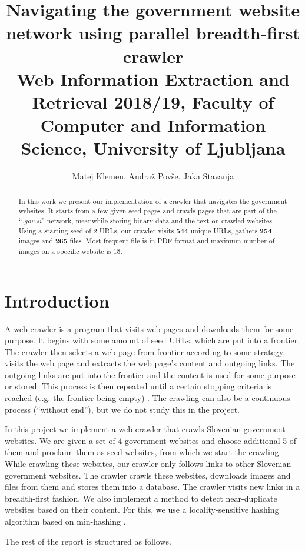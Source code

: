 \documentclass[9pt]{IEEEtran}
\title{\vspace{0ex} %
Navigating the government website network using parallel breadth-first crawler
\\ \normalsize{Web Information Extraction and Retrieval 2018/19, Faculty of Computer and Information Science, University of Ljubljana}}
\author{ %
Matej Klemen, Andraž Povše, Jaka Stavanja
\vspace{-4.0ex}
}
\begin{document}
\maketitle

\begin{abstract}
In this work we present our implementation of a crawler that navigates the government websites.
It starts from a few given seed pages and crawls pages that are part of the ``\textit{.gov.si}'' network, meanwhile storing binary data and the text on crawled websites.
Using a starting seed of 2 URLs, our crawler visits \textbf{544} unique URLs, gathers \textbf{254} images and \textbf{265} files. Most frequent file is in PDF format and maximum number of images on a specific website is 15.
\end{abstract}

\section{Introduction}

A web crawler is a program that visits web pages and downloads them for some purpose.
It begins with some amount of seed URLs, which are put into a frontier.
The crawler then selects a web page from frontier according to some strategy, visits the web page and extracts the web page's content and outgoing links.
The outgoing links are put into the frontier and the content is used for some purpose or stored.
This process is then repeated until a certain stopping criteria is reached (e.g. the frontier being empty) \cite{Manning2008}.
The crawling can also be a continuous process (``without end''), but we do not study this in the project. 

In this project we implement a web crawler that crawls Slovenian government websites. 
We are given a set of 4 government websites and choose additional 5 of them and proclaim them as seed websites, from which we start the crawling.
While crawling these websites, our crawler only follows links to other Slovenian government websites.
The crawler crawls these websites, downloads images and files from them and stores them into a database. 
The crawler visits new links in a breadth-first fashion.
We also implement a method to detect near-duplicate websites based on their content.
For this, we use a locality-sensitive hashing algorithm based on min-hashing \cite{Gionis1999}.

The rest of the report is structured as follows.
\end{document}
